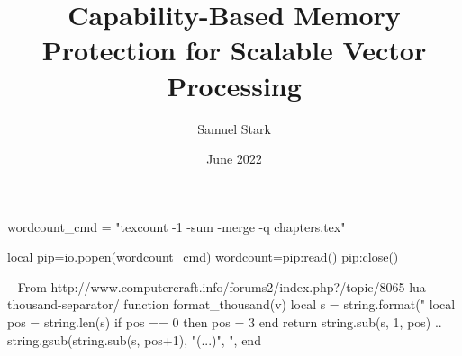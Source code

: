 
\title{Capability-Based Memory Protection for Scalable Vector Processing}

\author{Samuel Stark}





\date{June 2022}

\begin{luacode*}
wordcount_cmd = "texcount -1 -sum -merge -q chapters.tex"

local pip=io.popen(wordcount_cmd)
wordcount=pip:read()
pip:close()
    
-- From http://www.computercraft.info/forums2/index.php?/topic/8065-lua-thousand-separator/
function format_thousand(v)
    local s = string.format("%
    local pos = string.len(s) %
    if pos == 0 then pos = 3 end
    return string.sub(s, 1, pos)
    .. string.gsub(string.sub(s, pos+1), "(...)", ",%
end
\end{luacode*}


